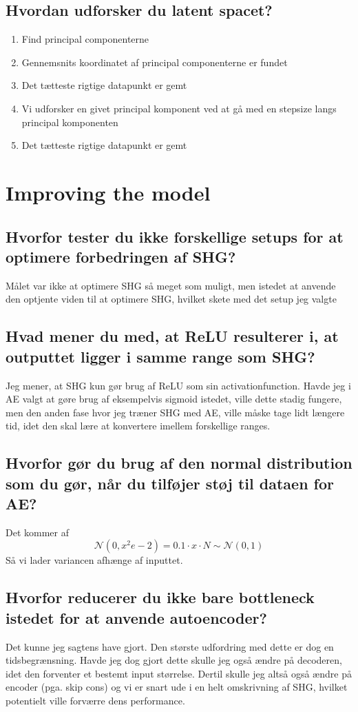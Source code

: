 \documentclass[a4paper]{article}
\begin{document}
\subsection{Hvordan udforsker du latent spacet?}
\begin{enumerate}
    \item Find principal componenterne
    \item Gennemsnits koordinatet af principal componenterne er fundet
    \item Det tætteste rigtige datapunkt er gemt
    \item Vi udforsker en givet principal komponent ved at gå med en stepsize langs principal komponenten
    \item Det tætteste rigtige datapunkt er gemt
\end{enumerate}

\section{Improving the model}
\subsection{Hvorfor tester du ikke forskellige setups for at optimere forbedringen af SHG?}
Målet var ikke at optimere SHG så meget som muligt, men istedet at anvende den optjente viden til at optimere SHG, hvilket skete med det setup jeg valgte

\subsection{Hvad mener du med, at ReLU resulterer i, at outputtet ligger i samme range som SHG?}
Jeg mener, at SHG kun gør brug af ReLU som sin activationfunction. Havde jeg i AE valgt at gøre brug af eksempelvis sigmoid istedet, ville dette stadig fungere, men den anden fase hvor jeg træner SHG med AE, ville måske tage lidt længere tid, idet den skal lære at konvertere imellem forskellige ranges. 

\subsection{Hvorfor gør du brug af den normal distribution som du gør, når du tilføjer støj til dataen for AE?}
Det kommer af
$$\mathcal{N} \left(0, x^2e-2 \right) = 0.1 \cdot x \cdot N \sim \mathcal{N} \left( 0, 1 \right)$$
Så vi lader variancen afhænge af inputtet.

\subsection{Hvorfor reducerer du ikke bare bottleneck istedet for at anvende autoencoder?}
Det kunne jeg sagtens have gjort. Den største udfordring med dette er dog en tidsbegrænsning. Havde jeg dog gjort dette skulle jeg også ændre på decoderen, idet den forventer et bestemt input størrelse. Dertil skulle jeg altså også ændre på encoder (pga. skip cons) og vi er snart ude i en helt omskrivning af SHG, hvilket potentielt ville forværre dens performance.
\end{document}
